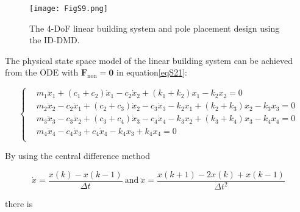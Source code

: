 \begin{figure}[!ht]
  \centering
  \texttt{[image: FigS9.png]}
  \caption{
  The 4-DoF linear building system and pole placement design using the ID-DMD.
  }
  \label{S9}
\end{figure}

The physical state space model of the linear building system can be achieved from the ODE with $\mathbf{F}_\text{non}=\mathbf{0}$ in equation\ref{eqS21}:

\begin{equation}
    \left\{\begin{aligned}
    & {{m}_{1}}{\ddot{x}_{1}}+({c}_{1}+{c}_{2}){\dot{x}_{1}}-{{c}_{2}}{\dot{x}_{2}}+({k}_{1}+{k}_{2}){{x}_{1}}-{{k}_{2}}{{x}_{2}}=0 \\ 
    & {{m}_{2}}{\ddot{x}_{2}}-{{c}_{2}}{\dot{x}_{1}}+({c}_{2}+{c}_{3}){\dot{x}_{2}}-{{c}_{3}}{\dot{x}_{3}}-{{k}_{2}}{{x}_{1}}+({k}_{2}+{k}_{3}){{x}_{2}}-{{k}_{3}}{{x}_{3}}=0 \\ 
    & {{m}_{3}}{\ddot{x}_{3}}-{{c}_{3}}{\dot{x}_{2}}+({c}_{3}+{c}_{4}){\dot{x}_{3}}-{{c}_{4}}{\dot{x}_{4}}-{{k}_{3}}{{x}_{2}}+({k}_{3}+{k}_{4}){{x}_{3}}-{{k}_{4}}{{x}_{4}}=0 \\ 
    & {{m}_{4}}{\ddot{x}_{4}}-{{c}_{4}}{\dot{x}_{3}}+{{c}_{4}}{\dot{x}_{4}}-{{k}_{4}}{{x}_{3}}+{{k}_{4}}{{x}_{4}}=0 \\ 
    \end{aligned} \right. \label{eqS25}
\end{equation}

By using the central difference method

\begin{equation*}
    \dot{x}=\frac{x(k)-x(k-1)}{\Delta t}\ \text{and}\ \ddot{x}=\frac{x(k+1)-2x(k)+x(k-1)}{\Delta {t}^{2}}
\end{equation*}

\noindent there is

